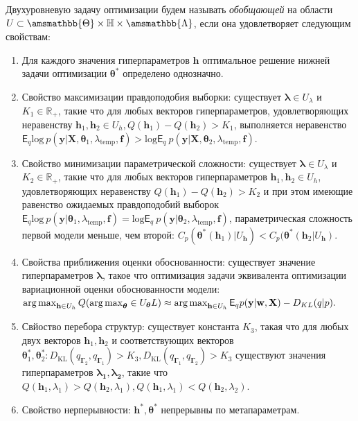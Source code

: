 \begin{defin}
Двухуровневую задачу оптимизации будем называть \textit{обобщающей} на области $U \subset \amsmathbb{\Theta} \times \mathbb{H} \times \amsmathbb{\Lambda}$, если она удовлетворяет следующим свойствам:
\begin{enumerate}
\item Для каждого значения гиперпараметров $\mathbf{h}$ оптимальное решение нижней задачи оптимизации $\boldsymbol{\theta}^{*}$ определено однозначно.

\item Свойство максимизации правдоподобия выборки: существует $\boldsymbol{\lambda} \in U_{\lambda}$ и  $K_1 \in \mathbb{R}_{+}$, такие что для любых векторов гиперпараметров, удовлетворяющих неравенству $\mathbf{h}_1, \mathbf{h}_2 \in  U_{h}, Q(\mathbf{h}_1) - Q(\mathbf{h}_2) > K_1$, выполняется неравенство $\mathsf{E}_q \text{log}~p(\mathbf{y}|\mathbf{X}, \boldsymbol{\theta}_1, \lambda_{\text{temp}}, \mathbf{f})>\text{log}\mathsf{E}_q ~p(\mathbf{y}|\mathbf{X}, \boldsymbol{\theta}_2, \lambda_{\text{temp}}, \mathbf{f})$.

\item Свойство минимизации параметрической сложности:  существует  $\boldsymbol{\lambda} \in U_{\lambda}$ и $K_2 \in \mathbb{R}_{+}$, такие что для любых векторов гиперпараметров $\mathbf{h}_1, \mathbf{h}_2 \in U_h$, удовлетворяющих неравенству $Q(\mathbf{h}_1) - Q(\mathbf{h}_2) > K_2$ и при этом имеющие равенство ожидаемых правдоподобий выборок  $\mathsf{E}_q \text{log}~p(\mathbf{y}|\boldsymbol{\theta}_1, \lambda_{\text{temp}}, \mathbf{f}) = \text{log}\mathsf{E}_q ~p(\mathbf{y}|\boldsymbol{\theta}_2, \lambda_{\text{temp}}, \mathbf{f})$, параметрическая сложность первой модели меньше, чем второй: $C_p(\boldsymbol{\theta}^{*}(\mathbf{h}_1)|U_\mathbf{h})<C_p(\boldsymbol{\theta}^{*}(\mathbf{h}_2|U_\mathbf{h})$.

\item Свойства приближения оценки обоснованности: существует значение гиперпараметров $\boldsymbol{\lambda}$, такое что оптимизация задачи эквивалента оптимизации вариационной оценки обоснованности модели: $\operatorname*{arg\,max}_{\mathbf{h} \in U_h}Q(\operatorname*{arg\,max}_{\boldsymbol{\theta}} \in U_{\boldsymbol{\theta}} L) \approx \operatorname*{arg\,max}_{\mathbf{h} \in U_h} \mathsf{E}_q p(\mathbf{y}|\mathbf{w}, \mathbf{X}) - {D}_{KL}(q|p).$

\item Свйоство перебора структур: существует константа $K_3$, такая что для любых двух векторов $\mathbf{h}_{1}, \mathbf{h}_2$ и соответствующих векторов $\boldsymbol{\theta}_1^{*},\boldsymbol{\theta}_2^{*}: D_\text{KL}(q_{\boldsymbol{\Gamma}_2}, q_{\boldsymbol{\Gamma}_1})>K_3, D_\text{KL}(q_{\boldsymbol{\Gamma}_1}, q_{\boldsymbol{\Gamma}_2})>K_3$  существуют значения гиперпараметров $\boldsymbol{\lambda_1},\boldsymbol{\lambda_2}$, такие что  $Q(\mathbf{h}_1, \lambda_1) > Q(\mathbf{h}_2, \lambda_1), Q(\mathbf{h}_1, \lambda_1) < Q(\mathbf{h}_2, \lambda_2)$.

\item Свойство нерперывности: $\mathbf{h}^{*}, \boldsymbol{\theta}^{*}$ непрерывны по метапараметрам.
\end{enumerate}
\end{defin}
